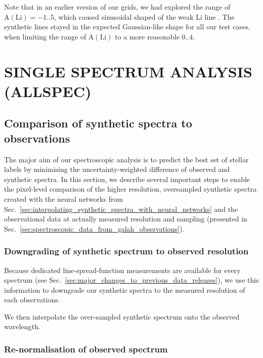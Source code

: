 \documentclass[
  journal=pasa,
  manuscript=research-paper, %
  year=2023,
  volume=37
]{cup-journal}
\begin{document}
Note that in an earlier version of our grids, we had explored the range of $\mathrm{A(Li)} = -1..5$, which caused sinusoidal shaped of the weak Li line \citep[see also][]{Wang2020}. The synthetic lines stayed in the expected Gaussian-like shape for all our test cases, when limiting the range of $\mathrm{A(Li)}$ to a more reasonable $0..4$.

\newpage
\section{SINGLE SPECTRUM ANALYSIS (ALLSPEC)}
\label{sec:allspec_analysis}


\subsection{Comparison of synthetic spectra to observations}
\label{sec:comparison_synthetic_spectra_to_observations}

The major aim of our spectroscopic analysis is to predict the best set of stellar labels by minimising the uncertainty-weighted difference of observed and synthetic spectra. In this section, we describe several important steps to enable the pixel-level comparison of the higher resolution, oversampled synthetic spectra created with the neural networks from Sec.~\ref{sec:interpolating_synthetic_spectra_with_neural_networks} and the observational data at actually measured resolution and sampling (presented in Sec.~\ref{sec:spectroscopic_data_from_galah_observations}).

\subsubsection{Downgrading of synthetic spectrum to observed resolution}

Because dedicated line-spread-function measurements are available for every spectrum (see Sec.~\ref{sec:major_changes_to_previous_data_releases}), we use this information to downgrade our synthetic spectra to the measured resolution of each observations.

We then interpolate the over-sampled synthetic spectrum onto the observed wavelength.

\subsubsection{Re-normalisation of observed spectrum}
\end{document}
